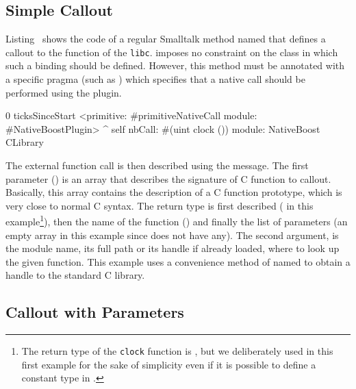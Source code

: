 \subsection{Simple Callout}

Listing~ shows the code of a regular Smalltalk method named  that defines a callout to the  function of the \texttt{libc}.
\NB imposes no constraint on the class in which such a binding should be defined.
However, this method must be annotated with a specific pragma (such as ) which specifies that a native call should be performed using the \NB plugin.

\begin{stcode}[
	label={lst:clock},
	caption={\NBFFI example of callout declaration to the \ttt{clock} function of the \texttt{libc}}]{0}
ticksSinceStart
	<primitive: #primitiveNativeCall
	 module: #NativeBoostPlugin>
	^ self
		nbCall: #(uint clock ())
		module: NativeBoost CLibrary
\end{stcode}

The external function call is then described using the  message.
The first parameter () is an array that describes the signature of C function to callout.
Basically, this array contains the description of a C function prototype, which is very close to normal C syntax.
The return type is first described ( in this example\footnote{The return type of the \texttt{clock} function is , but we deliberately used  in this first example for the sake of simplicity even if it is possible to define a constant type in \NB.}), then the name of the function () and finally the list of parameters (an empty array in this example since  does not have any).
The second argument,  is the module name, its full path or its handle if already loaded, where to look up the given function.
This example uses a convenience method of \NB named  to obtain a handle to the standard C library.

\subsection{Callout with Parameters}

